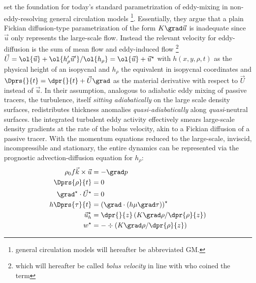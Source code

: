 

\section*{\citealt{gent1990isopycnal,gent1995parameterizing}}\label{sec:hist_gentmcw}
\citeauthor*{gent1990isopycnal} set the foundation for today's standard parametrization of eddy-mixing in non-eddy-resolving general circulation models \footnote{general circulation models will hereafter be abbreviated GM.}.
Essentially, they argue that a plain Fickian diffusion-type parametrization of
the form $K \grad \vec{u}$ is inadequate since $\vec{u}$ only represents the
large-scale flow.
Instead the relevant velocity for eddy-diffusion is the sum of mean flow and eddy-induced flow \footnote{which will hereafter be called \textit{bolus velocity} in line with \cite{rhines1982basic} who coined the term} $\vec{U}=\ol{\vec{u}} + \ol{h'_{\rho} \vec{u}'}/\ol{h_{\rho}} =\ol{\vec{u}} + \vec{u}^{\star}$ with $h(x,y,\rho,t)$ as the physical height of an isopycnal and $h_{\rho}$ the equivalent in isopycnal coordinates and $\Dprs{}{t}= \dpr{}{t} +\vec{U} \grad $ as the material derivative with respect to $\vec{U}$ instead of $\vec{u}$.
In their assumption, analogous to adiabatic eddy mixing of passive tracers, the  turbulence, itself \textit{sitting adiabatically} on the large scale density surfaces, redistributes thickness anomalies \textit{quasi-adiabatically} along \textit{quasi}-neutral surfaces. \Ie the integrated turbulent eddy activity effectively smears large-scale density gradients at the rate of the bolus velocity, akin to a Fickian diffusion of a passive tracer. With the momentum equations reduced to the large-scale, inviscid, incompressible and stationary, the entire dynamics can be represented via the prognostic advection-diffusion equation for $h_{\rho}$: \\
\begin{subequations}\begin{align}
	\rho_0  f \vec{k} \times \vec{u}
	&=
	-\grad p\\
	\Dprs{\rho}{t} %
	&=
	0 \\
	\grad^{\star} \cdot \vec{U}^{\star}
	&=
	0	\\
	 \addtocounter{equation}{+3}
	h \Dprs{\tau}{t}
	&=
	 \left(\grad \cdot \left( h\mu \grad \tau \right) \right)^{\star}	\label{eq:fick_tracer}\\
 \vec{u}_h^{\star} &= \dpr{}{z}\left( K \grad \rho/\dpr{\rho}{z} \right) \\
w^{\star} &=-\div\left( K \grad \rho/\dpr{\rho}{z} \right)
\end{align}\end{subequations}
